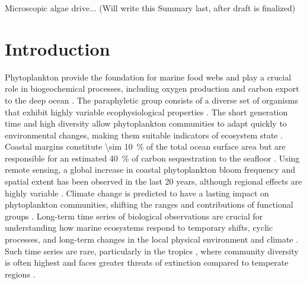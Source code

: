 \documentclass[draft]{agujournal2019}
\begin{document}
Microscopic algae drive... (Will write this Summary last, after draft is finalized) 





\section{Introduction}
%


    Phytoplankton provide the foundation for marine food webs and play a crucial role in biogeochemical processes, including oxygen production and carbon export to the deep ocean \cite{falkowski_biogeochemical_1998}. The paraphyletic group consists of a diverse set of organisms that exhibit highly variable ecophysiological properties \cite{appeltans_magnitude_2012}. The short generation time and high diversity allow phytoplankton communities to adapt quickly to environmental changes, making them suitable indicators of ecosystem state \cite{alvarez-cobelas_what_1998, barton_anthropogenic_2016, di_cavalho_temporal_2023}.
    Coastal margins constitute \qty{\sim 10}{\%} of the total ocean surface area but are responsible for an estimated \qty{40}{\%} of carbon sequestration to the seafloor \cite{yool_examination_2001, mullerkarger_importance_2005}. Using remote sensing, a global increase in coastal phytoplankton bloom frequency and spatial extent has been observed in the last 20 years, although regional effects are highly variable \cite{dai_coastal_2023}.
    Climate change is predicted to have a lasting impact on phytoplankton communities, shifting the ranges and contributions of functional groups \cite{boyd_biological_2016, henson_future_2021}. 
    Long-term time series of biological observations are crucial for understanding how marine ecosystems respond to temporary shifts, cyclic processes, and long-term changes in the local physical environment and climate \cite{carstensen_need_2014, henson_observing_2016}. Such time series are rare, particularly in the tropics \cite{clarke_does_2017}, where community diversity is often highest \cite{brown_why_2014, righetti_global_2019} and faces greater threats of extinction compared to temperate regions \cite{finnegan_paleontological_2015}. 
\end{document}
